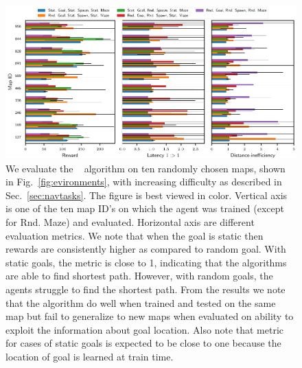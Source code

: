 \begin{figure}%
  \includegraphics[width=\linewidth]{images/plot_summary_bar_plots.pdf}%
  \caption{
    We evaluate the \NavAiiiCDiDiiL{}~\cite{MiPaViICLR2017} algorithm on ten randomly chosen maps, shown in Fig.~\ref{fig:evironments}, with increasing difficulty as described in Sec.~\ref{sec:navtasks}.
    The figure is best viewed in color.
    Vertical axis is one of the ten map ID's on which the agent was trained (except for Rnd. Maze) and evaluated.
    Horizontal axis are different evaluation metrics.
    We note that when the goal is static then rewards are consistently higher as compared to random goal.
    With static goals, the metric \DistanceInefficiency{} is close to 1,
    indicating that the algorithms are able to find shortest path.
    However, with random goals, the agents struggle to find the shortest path.
    From the \LatencyOneGtOne{} results we note that the algorithm do well when trained and tested on the same map but fail to generalize to new maps when evaluated on ability to exploit the information about goal location.
    Also note that \LatencyOneGtOne{} metric for cases of static goals is expected to be close to one because the location of goal is learned at train time.
  }%
\label{fig:latency-goal-reward}%
\end{figure}
